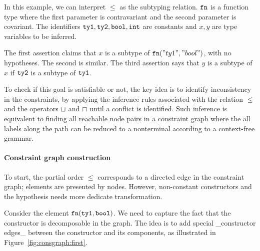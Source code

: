 In this example, we can interpret $\leq$ as the subtyping relation. $\mathtt{fn}$ is
a function type where the first parameter is contravariant and the second
parameter is covariant. The identifiers $\mathtt{ty1}, \mathtt{ty2}, \mathtt{bool},
\mathtt{int}$ are constants and $x, y$ are type variables to be inferred.

The first assertion claims that $x$ is a subtype of $\mathtt{fn} ("ty1",
"bool")$, with no hypotheses. The second is similar.
The third assertion says that $y$ is a subtype of $x$ if $\mathtt{ty2}$ is
a subtype of $\mathtt{ty1}$.

To check if this goal is satisfiable or not, the key idea is to
identify inconsistency in the constraints, by applying the inference
rules associated with the relation $\leq$ and the operators $\sqcup$
and $\sqcap$ until a conflict is identified. Such
inference is equivalent to finding all reachable node pairs in a
constraint graph where the all labels along the path can be reduced to
a nonterminal according to a context-free grammar.

\paragraph{Constraint graph construction}
To start, the partial order $\leq$ corresponds to a directed edge in
the constraint graph; elements are presented by nodes. However,
non-constant constructors and the hypothesis needs more dedicate
transformation.

Consider the element $\mathtt{fn} (\mathtt{ty1}, \mathtt{bool})$. We need to capture
the fact that the constructor is decomposable in the graph. The idea is to add
special _constructor edges_ between the constructor and its
components, as illustrated in Figure~\ref{fig:consgraph:first}.

